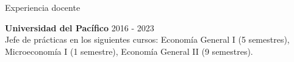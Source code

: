 \documentclass{resume} %
\begin{document}
\pagebreak


\begin{rSection}{Experiencia docente}

{\bf Universidad del Pacífico}  \hfill {2016 - 2023}\\
Jefe de prácticas en los siguientes cursos: Economía General I (5 semestres), Microeconomía I (1 semestre), Economía General II (9 semestres).
    
\end{rSection}

\end{document}
